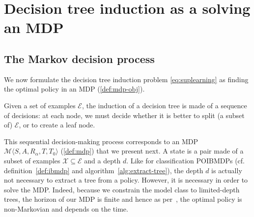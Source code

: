 \chapter{Decision tree induction as a solving an MDP}\label{sec:dt-mdp}

\section{The Markov decision process}\label{sec:the-mdp}
We now formulate the decision tree induction problem \ref{eq:suplearning} as finding the optimal policy in an MDP (\ref{def:mdp-obj}).

Given a set of examples $\mathcal{E}$, the induction of a decision tree is made of a sequence of decisions: at each node, we must decide whether it is better to split (a subset of) $\mathcal{E}$, or %
to create a leaf node.

This sequential decision-making process corresponds to an MDP $\mathcal{M} \langle S, A, R_{\alpha}, T, T_0 \rangle$ (\ref{def:mdp}) that we present next.
A state is a pair made of a subset of examples $\mathcal{X}\subseteq\mathcal E$ and a depth $d$.
Like for classification POIBMDPs (cf. definition~\ref{def:ibmdp} and algorithm~\ref{alg:extract-tree}), the depth $d$ is actually not necessary to extract a tree from a policy.
However, it is necessary in order to solve the MDP.
Indeed, because we constrain the model class to limited-depth trees, the horizon of our MDP is finite and hence as per~\cite{puterman}, the optimal policy is non-Markovian and depends on the time.


